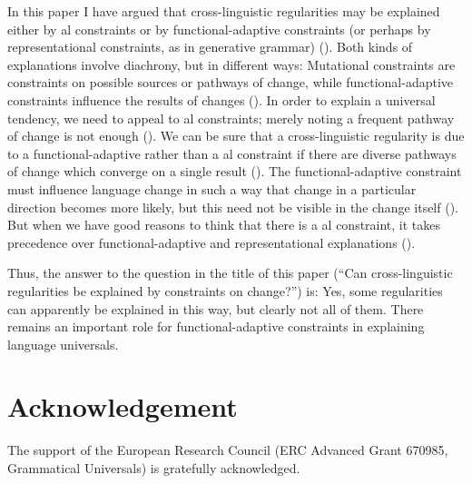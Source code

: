 \documentclass[output=paper]{langsci/langscibook}
\begin{document}
In this paper I have argued that cross-linguistic regularities may be explained either by al constraints or by functional-adaptive constraints (or perhaps by representational constraints, as in generative grammar) (). Both kinds of explanations involve diachrony, but in different ways: Mutational constraints are constraints on possible sources or pathways of change, while functional-adaptive constraints influence the results of changes (). In order to explain a universal tendency, we need to appeal to al constraints; merely noting a frequent pathway of change is not enough (). We can be sure that a cross-linguistic regularity is due to a functional-adaptive rather than a al constraint if there are diverse pathways of change which converge on a single result (). The functional-adaptive constraint must influence language change in such a way that change in a particular direction becomes more likely, but this need not be visible in the change itself (). But when we have good reasons to think that there is a al constraint, it takes precedence over functional-adaptive and representational explanations ().

Thus, the answer to the question in the title of this paper (“Can cross-linguistic regularities be explained by constraints on change?”) is: Yes, some regularities can apparently be explained in this way, but clearly not all of them. There remains an important role for functional-adaptive constraints in explaining language universals.

\section*{Acknowledgement}

The support of the European Research Council (ERC Advanced Grant 670985, Grammatical Universals) is gratefully acknowledged. 

\sloppy
\printbibliography[heading=subbibliography,notkeyword=this] 
 
\end{document}
